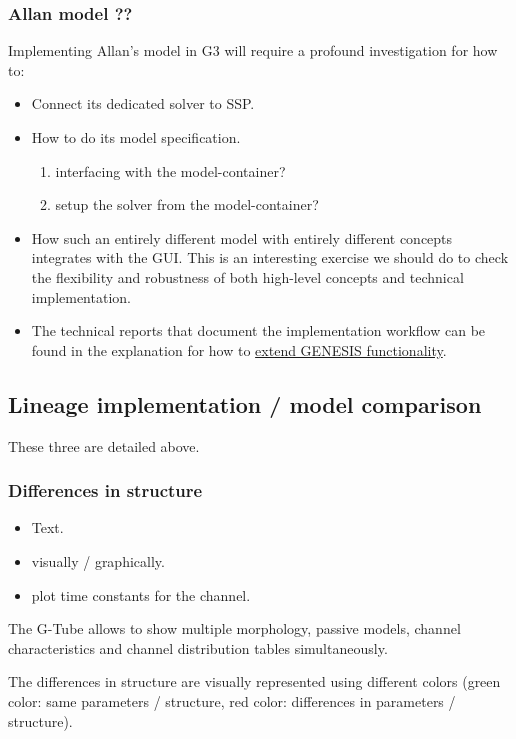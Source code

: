 \documentclass[12pt]{article}
\begin{document}
\subsubsection{Allan model ??}
Implementing Allan's model in G3 will require a profound investigation
for how to:
\begin{itemize}
\item Connect its dedicated solver to SSP.
\item How to do its model specification.
  \begin{enumerate}
  \item interfacing with the model-container?
  \item setup the solver from the model-container?
  \end{enumerate}
\item How such an entirely different model with entirely different
  concepts integrates with the GUI.  This is an interesting exercise
  we should do to check the flexibility and robustness of both
  high-level concepts and technical implementation.
\item The technical reports that document the implementation workflow
  can be found in the explanation for how to
  \href{../genesis-extend-functionality/genesis-extend-functionality.tex}{extend
    GENESIS functionality}.
\end{itemize}

\subsection{Lineage implementation / model comparison}

These three are detailed above.


\subsubsection{Differences in structure}
\begin{itemize}
\item Text.
\item visually / graphically.
\item plot time constants for the channel.
\end{itemize}

The G-Tube allows to show multiple morphology, passive models, channel
characteristics and channel distribution tables simultaneously.

The differences in structure are visually represented using different
colors (green color: same parameters / structure, red color:
differences in parameters / structure).
\end{document}
